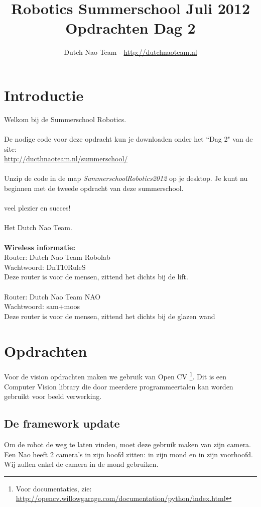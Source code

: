 \documentclass[a4paper]{article}
\title{\textbf{Robotics Summerschool Juli 2012} \\ Opdrachten Dag 2}
\author{Dutch Nao Team - \url{http://dutchnaoteam.nl}}
\date{}
\begin{document}
\maketitle

\section{Introductie}
Welkom bij de Summerschool Robotics.\\
\\
De nodige code voor deze opdracht kun je downloaden onder het ``Dag 2" van de site:\\ 
\url{http://ducthnaoteam.nl/summerschool/}\\
\\
Unzip de code in de map \textit{SummerschoolRobotics2012} op je desktop. Je kunt nu beginnen met de tweede opdracht van deze summerschool. \\
\\
veel plezier en succes!\\
\\
Het Dutch Nao Team.\\
\\
\textbf{Wireless informatie:}\\
Router:  Dutch Nao Team Robolab\\
Wachtwoord: DnT10RuleS\\
Deze router is voor de mensen, zittend het dichts bij de lift.\\
\\
Router:  Dutch Nao Team NAO\\
Wachtwoord: sam+moos\\
Deze router is voor de mensen, zittend het dichts bij de glazen wand

\tableofcontents

\newpage

\section{Opdrachten}
Voor de vision opdrachten maken we gebruik van Open CV \footnote{Voor documentaties, zie: \\ \url{http://opencv.willowgarage.com/documentation/python/index.html}}. Dit is een Computer Vision library die door meerdere programmeertalen kan worden gebruikt voor beeld verwerking.

\subsection{De framework update}
Om de robot de weg te laten vinden, moet deze gebruik maken van zijn camera. Een Nao heeft 2 camera's in zijn hoofd zitten: in zijn mond en in zijn voorhoofd. Wij zullen enkel de camera in de mond gebruiken.
\end{document}
